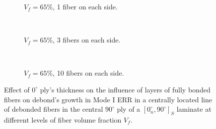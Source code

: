 \documentclass[review]{elsarticle}
\begin{document}
\begin{figure}[!h]
    \begin{subfigure}[b]{0.3\textwidth}
        \caption{$V_{f}=65\%$, 1 fiber on each side.}\label{subfig:abovefiber65MIcase1}
    \end{subfigure} ~
   \begin{subfigure}[b]{0.3\textwidth}
        \caption{$V_{f}=65\%$, 3 fibers on each side.}\label{subfig:abovefiber65MIcase2}
    \end{subfigure} ~
\begin{subfigure}[b]{0.3\textwidth}
        \caption{$V_{f}=65\%$, 10 fibers on each side.}\label{subfig:abovefiber65MIcase3}
    \end{subfigure}

\caption{Effect of $0^{\circ}$ ply's thickness on the influence of layers of fully bonded fibers on debond's growth in Mode I ERR in a centrally located line of debonded fibers in the central $90^{\circ}$ ply of a $\left[0^{\circ}_{n}, 90^{\circ}\right]_{S}$ laminate at different levels of fiber volume fraction $V_{f}$.}\label{fig:abovefibersthicknessMI}
\end{figure}
\end{document}
